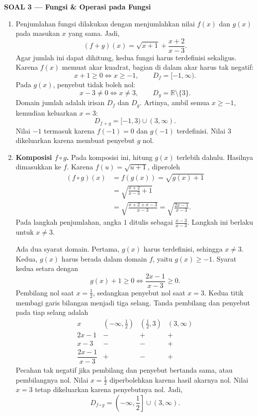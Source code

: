 \documentclass[11pt,a4paper]{article}
\newcommand{\judulsolusi}[2]{%
  \par\bigskip\textbf{SOAL #1 --- #2}\par\smallskip}
\begin{document}
\newpage
\judulsolusi{3}{Fungsi \& Operasi pada Fungsi}
\begin{enumerate}
  \item Penjumlahan fungsi dilakukan dengan menjumlahkan nilai $f(x)$ dan $g(x)$
        pada masukan $x$ yang sama.
        Jadi,
        \[
          \boxed{(f+g)(x)=\sqrt{x+1}+\frac{x+2}{x-3}}.
        \]
        Agar jumlah ini dapat dihitung, kedua fungsi harus terdefinisi sekaligus.
        Karena $f(x)$ memuat akar kuadrat, bagian di dalam akar harus tak negatif:
        \[
          x+1\ge0\iff x\ge-1,
          \qquad D_f=[-1,\infty).
        \]
        Pada $g(x)$, penyebut tidak boleh nol:
        \[
          x-3\ne0\iff x\ne3,
          \qquad D_g=\mathbb{R}\setminus\{3\}.
        \]
        Domain jumlah adalah irisan $D_f$ dan $D_g$.
        Artinya, ambil semua $x\ge-1$, kemudian keluarkan $x=3$:
        \[
          \boxed{D_{f+g}=[-1,3)\cup(3,\infty)}.
        \]
        Nilai $-1$ termasuk karena $f(-1)=0$ dan $g(-1)$ terdefinisi.
        Nilai $3$ dikeluarkan karena membuat penyebut $g$ nol.

  \item \textbf{Komposisi $f\circ g$.}
        Pada komposisi ini, hitung $g(x)$ terlebih dahulu.
        Hasilnya dimasukkan ke $f$.
        Karena $f(u)=\sqrt{u+1}$, diperoleh
        \begin{align*}
          (f\circ g)(x) & =f(g(x))=\sqrt{g(x)+1}      \\
                        & =\sqrt{\frac{x+2}{x-3}+1}   \\
                        & =\sqrt{\frac{x+2+x-3}{x-3}}
          =\boxed{\sqrt{\frac{2x-1}{x-3}}}.
        \end{align*}
        Pada langkah penjumlahan, angka $1$ ditulis sebagai $\frac{x-3}{x-3}$.
        Langkah ini berlaku untuk $x\ne3$.

        Ada dua syarat domain.
        Pertama, $g(x)$ harus terdefinisi, sehingga $x\ne3$.
        Kedua, $g(x)$ harus berada dalam domain $f$, yaitu $g(x)\ge-1$.
        Syarat kedua setara dengan
        \[
          g(x)+1\ge0\iff\frac{2x-1}{x-3}\ge0.
        \]
        Pembilang nol saat $x=\frac12$, sedangkan penyebut nol saat $x=3$.
        Kedua titik membagi garis bilangan menjadi tiga selang.
        Tanda pembilang dan penyebut pada tiap selang adalah
        \[
          \begin{array}{c|ccc}
            x                 & (-\infty,\frac12) & (\frac12,3) & (3,\infty) \\ \hline
            2x-1              & -                 & +           & +          \\
            x-3               & -                 & -           & +          \\ \hline
            \dfrac{2x-1}{x-3} & +                 & -           & +
          \end{array}
        \]
        Pecahan tak negatif jika pembilang dan penyebut bertanda sama, atau pembilangnya nol.
        Nilai $x=\frac12$ diperbolehkan karena hasil akarnya nol.
        Nilai $x=3$ tetap dikeluarkan karena penyebutnya nol.
        Jadi,
        \[
          \boxed{D_{f\circ g}=\left(-\infty,\frac12\right]\cup(3,\infty)}.
        \]


\end{enumerate}
\end{document}
